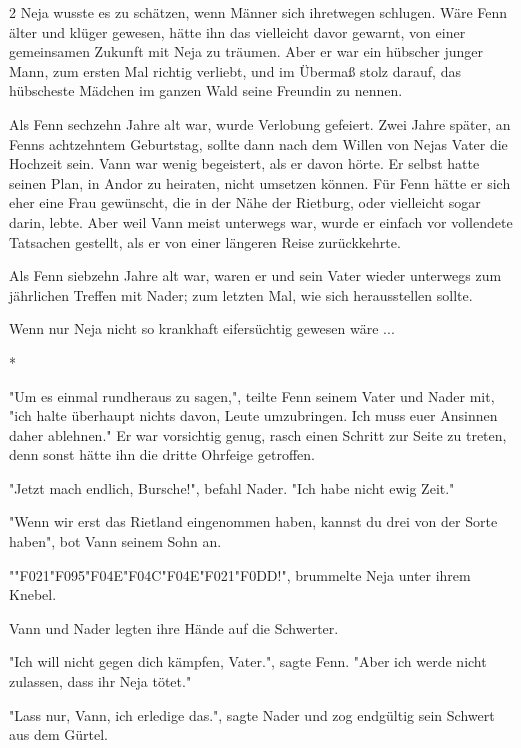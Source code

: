 \documentclass[10pt, a4paper, oneside]{book}
\newcommand{\webdingsspider}{{\webdings\char"F021}}
\newcommand{\webdingsratingviolence}{{\webdings\char"F095}}
\newcommand{\wingdingsskullcrossbones}{{\wingdings\char"F04E}}
\newcommand{\wingdingsfrownface}{{\wingdings\char"F04C}}
\newcommand{\webdingstwister}{{\webdings\char"F0DD}}
\begin{document}
\begin{multicols}{2}
Neja wusste es zu schätzen, wenn Männer sich ihretwegen schlugen. Wäre Fenn älter und klüger gewesen, hätte ihn das vielleicht davor gewarnt, von einer gemeinsamen Zukunft mit Neja zu träumen. Aber er war ein hübscher junger Mann, zum ersten Mal richtig verliebt, und im Übermaß stolz darauf, das hübscheste Mädchen im ganzen Wald seine Freundin zu nennen.

Als Fenn sechzehn Jahre alt war, wurde Verlobung gefeiert. Zwei Jahre später, an Fenns achtzehntem Geburtstag, sollte dann nach dem Willen von Nejas Vater die Hochzeit sein. Vann war wenig begeistert, als er davon hörte. Er selbst hatte seinen Plan, in Andor zu heiraten, nicht umsetzen können. Für Fenn hätte er sich eher eine Frau gewünscht, die in der Nähe der Rietburg, oder vielleicht sogar darin, lebte. Aber weil Vann meist unterwegs war, wurde er einfach vor vollendete Tatsachen gestellt, als er von einer längeren Reise zurückkehrte. 

Als Fenn siebzehn Jahre alt war, waren er und sein Vater wieder unterwegs zum jährlichen Treffen mit Nader; zum letzten Mal, wie sich herausstellen sollte.

Wenn nur Neja nicht so krankhaft eifersüchtig gewesen wäre ...

\begin{center}
    *
\end{center}

"Um es einmal rundheraus zu sagen,", teilte Fenn seinem Vater und Nader mit, "ich halte überhaupt nichts davon, Leute umzubringen. Ich muss euer Ansinnen daher ablehnen." Er war vorsichtig genug, rasch einen Schritt zur Seite zu treten, denn sonst hätte ihn die dritte Ohrfeige getroffen.

"Jetzt mach endlich, Bursche!", befahl Nader. "Ich habe nicht ewig Zeit."

"Wenn wir erst das Rietland eingenommen haben, kannst du drei von der Sorte haben", bot Vann seinem Sohn an.

"\webdingsspider\webdingsratingviolence\wingdingsskullcrossbones\wingdingsfrownface\wingdingsskullcrossbones\webdingsspider\webdingstwister!", brummelte Neja unter ihrem Knebel.

Vann und Nader legten ihre Hände auf die Schwerter.

"Ich will nicht gegen dich kämpfen, Vater.", sagte Fenn. "Aber ich werde nicht zulassen, dass ihr Neja tötet."

"Lass nur, Vann, ich erledige das.", sagte Nader und zog endgültig sein Schwert aus dem Gürtel.


\end{multicols}
\end{document}
